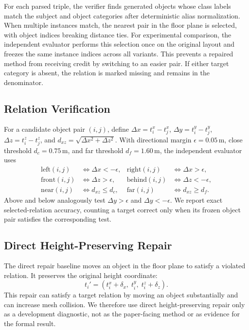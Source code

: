 \documentclass{egpubl}
\begin{document}
For each parsed triple, the verifier finds generated objects whose class labels match the subject and object categories after deterministic alias normalization. When multiple instances match, the nearest pair in the floor plane is selected, with object indices breaking distance ties. For experimental comparison, the independent evaluator performs this selection once on the original layout and freezes the same instance indices across all variants. This prevents a repaired method from receiving credit by switching to an easier pair. If either target category is absent, the relation is marked missing and remains in the denominator.

\subsection{Relation Verification}

For a candidate object pair $(i,j)$, define $\Delta x=t_i^x-t_j^x$, $\Delta y=t_i^y-t_j^y$, $\Delta z=t_i^z-t_j^z$, and $d_{xz}=\sqrt{\Delta x^2+\Delta z^2}$. With directional margin $\epsilon=0.05$\,m, close threshold $d_c=0.75$\,m, and far threshold $d_f=1.60$\,m, the independent evaluator uses
\[
\begin{aligned}
\text{left}(i,j)&\Leftrightarrow \Delta x<-\epsilon,&
\text{right}(i,j)&\Leftrightarrow \Delta x>\epsilon,\\
\text{front}(i,j)&\Leftrightarrow \Delta z>\epsilon,&
\text{behind}(i,j)&\Leftrightarrow \Delta z<-\epsilon,\\
\text{near}(i,j)&\Leftrightarrow d_{xz}\le d_c,&
\text{far}(i,j)&\Leftrightarrow d_{xz}\ge d_f.
\end{aligned}
\]
Above and below analogously test $\Delta y>\epsilon$ and $\Delta y<-\epsilon$. We report exact selected-relation accuracy, counting a target correct only when its frozen object pair satisfies the corresponding test.

\subsection{Direct Height-Preserving Repair}

The direct repair baseline moves an object in the floor plane to satisfy a violated relation. It preserves the original height coordinate:
\[
  t_i' = (t_i^x + \delta_x, \; t_i^y, \; t_i^z + \delta_z).
\]
This repair can satisfy a target relation by moving an object substantially and can increase mesh collision. We therefore use direct height-preserving repair only as a development diagnostic, not as the paper-facing method or as evidence for the formal result.
\end{document}

